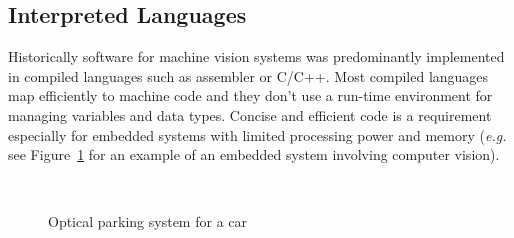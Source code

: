 \documentclass[12pt,a4paper,oneside,openright]{book}
\newcommand{\eg}{\emph{e.g.} }
\newcommand{\fig}[1]{Figure~\ref{fig:#1}}
\begin{document}
\begin{CJK}{UTF8}{}
\section{Interpreted Languages}\label{cha:interpreted}
Historically software for machine vision systems was predominantly implemented in compiled languages such as assembler or C/C++. Most compiled languages map efficiently to machine code and they don't use a run-time environment for managing variables and data types. Concise and efficient code is a requirement especially for embedded systems with limited processing power and memory (\eg see \fig{parking} for an example of an embedded system involving computer vision).
\begin{figure}[htbp]
   \begin{center}
     \\
     \caption{Optical parking system for a car\label{fig:parking}}
   \end{center}
\end{figure}


\end{CJK}
\end{document}
